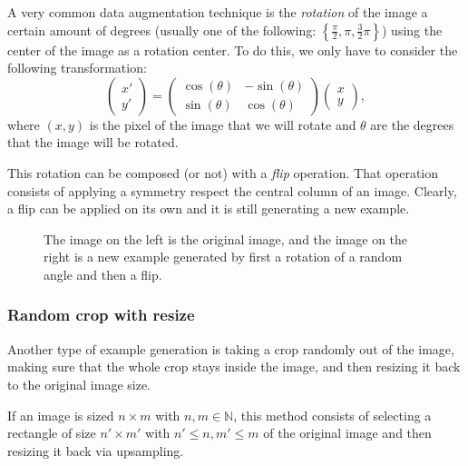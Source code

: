 A very common data augmentation technique is the \emph{rotation} of the image a certain amount of degrees (usually one of the following: $\left\{\frac{\pi}{2}, \pi, \frac{3}{2}\pi\right\}$) using the center of the image as a rotation center. To do this, we only have to consider the following transformation:
\[
\begin{pmatrix} x' \\ y' \end{pmatrix} = \begin{pmatrix} \cos(\theta) & - \sin(\theta) \\ \sin(\theta) & \cos(\theta)\end{pmatrix} \begin{pmatrix} x \\ y\end{pmatrix}  ,  
\]
where $(x,y)$ is the pixel of the image that we will rotate and $\theta$ are the degrees that the image will be rotated.

This rotation can be composed (or not) with a \emph{flip} operation. That operation consists of applying a symmetry respect the central column of an image. Clearly, a flip can be applied on its own and it is still generating a new example.

\begin{figure}[H] 
    \centering
    \hfill%
        \caption{The image on the left is the original image, and the image on the right is a new example generated by first a rotation of a random angle and then a flip.}
\end{figure}


\subsubsection*{Random crop with resize}

Another type of example generation is taking a crop randomly out of the image, making sure that the whole crop stays inside the image, and then resizing it back to the original image size. 

If an image is sized $n\times m$ with $n,m \in \mathbb N$, this method consists of selecting a rectangle of size $n'\times m'$ with $n' \leq n, m' \leq m$ of the original image and then resizing it back via upsampling\footnotemark.

